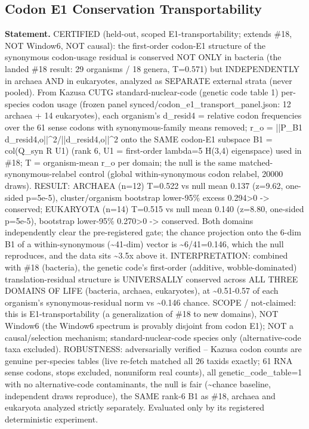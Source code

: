 \subsection{Codon E1 Conservation Transportability}\label{sec:bridge-codon-e1-conservation-transportability}
\textbf{Statement.} CERTIFIED (held-out, scoped E1-transportability; extends \#18, NOT Window6, NOT causal): the
first-order codon-E1 structure of the synonymous codon-usage residual is conserved NOT ONLY in
bacteria (the landed \#18 result: 29 organisms / 18 genera, T=0.571) but INDEPENDENTLY in archaea
AND in eukaryotes, analyzed as SEPARATE external strata (never pooled). From Kazusa CUTG
standard-nuclear-code (genetic code table 1) per-species codon usage (frozen panel
synced/codon\_e1\_transport\_panel.json: 12 archaea + 14 eukaryotes), each organism's d\_resid4 =
relative codon frequencies over the 61 sense codons with synonymous-family means removed; r\_o =
||P\_B1 d\_resid4,o||\textasciicircum{}2/||d\_resid4,o||\textasciicircum{}2 onto the SAME codon-E1
subspace B1 = col(Q\_syn R U1) (rank 6, U1 = first-order lambda=5 H(3,4) eigenspace) used in \#18; T
= organism-mean r\_o per domain; the null is the same matched-synonymous-relabel control (global
within-synonymous codon relabel, 20000 draws). RESULT: ARCHAEA (n=12) T=0.522 vs null mean 0.137
(z=9.62, one-sided p=5e-5), cluster/organism bootstrap lower-95\% excess 0.294>0 -> conserved;
EUKARYOTA (n=14) T=0.515 vs null mean 0.140 (z=8.80, one-sided p=5e-5), bootstrap lower-95\% 0.270>0
-> conserved. Both domains independently clear the pre-registered gate; the chance projection onto
the 6-dim B1 of a within-synonymous (\textasciitilde{}41-dim) vector is \textasciitilde{}6/41=0.146,
which the null reproduces, and the data sits \textasciitilde{}3.5x above it. INTERPRETATION:
combined with \#18 (bacteria), the genetic code's first-order (additive, wobble-dominated)
translation-residual structure is UNIVERSALLY conserved across ALL THREE DOMAINS OF LIFE (bacteria,
archaea, eukaryotes), at \textasciitilde{}0.51-0.57 of each organism's synonymous-residual norm vs
\textasciitilde{}0.146 chance. SCOPE / not-claimed: this is E1-transportability (a generalization of
\#18 to new domains), NOT Window6 (the Window6 spectrum is provably disjoint from codon E1); NOT a
causal/selection mechanism; standard-nuclear-code species only (alternative-code taxa excluded).
ROBUSTNESS: adversarially verified -- Kazusa codon counts are genuine per-species tables (live
re-fetch matched all 26 taxids exactly; 61 RNA sense codons, stops excluded, nonuniform real
counts), all genetic\_code\_table=1 with no alternative-code contaminants, the null is fair
(\textasciitilde{}chance baseline, independent draws reproduce), the SAME rank-6 B1 as \#18, archaea
and eukaryota analyzed strictly separately. Evaluated only by its registered deterministic
experiment.

